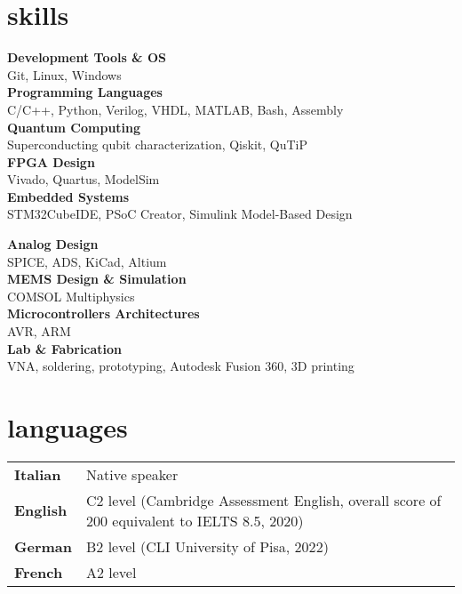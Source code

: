 \documentclass[10pt]{article}
\begin{document}
\section{skills}
\begin{minipage}[t]{0.48\textwidth}
    \textbf{Development Tools \& OS} \\
    Git, Linux, Windows
    \\[4pt]
    \textbf{Programming Languages} \\
    C/C++, Python, Verilog, VHDL, MATLAB, Bash, Assembly \\[4pt]
    \textbf{Quantum Computing} \\
    Superconducting qubit characterization, Qiskit, QuTiP \\[4pt]
    \textbf{FPGA Design} \\
    Vivado, Quartus, ModelSim
    \\[4pt]
    \textbf{Embedded Systems} \\
    STM32CubeIDE, PSoC Creator, Simulink Model-Based Design
\end{minipage}
\hfill
\begin{minipage}[t]{0.48\textwidth}
    \textbf{Analog Design} \\
    SPICE, ADS, KiCad, Altium
    \\[4pt]
    \textbf{MEMS Design \& Simulation} \\
    COMSOL Multiphysics \\[4pt]
    \textbf{Microcontrollers Architectures} \\
    AVR, ARM
    \\[4pt]
    \textbf{Lab \& Fabrication} \\
    VNA, soldering, prototyping, Autodesk Fusion 360, 3D printing
\end{minipage}

\section{languages}
\begin{tabular}{l l}
    \textbf{Italian} & Native speaker \\
    \textbf{English} & C2 level (Cambridge Assessment English, overall score of 200 equivalent to IELTS 8.5, 2020) \\
    \textbf{German} & B2 level (CLI University of Pisa, 2022) \\
    \textbf{French} & A2 level
\end{tabular}
\end{document}
